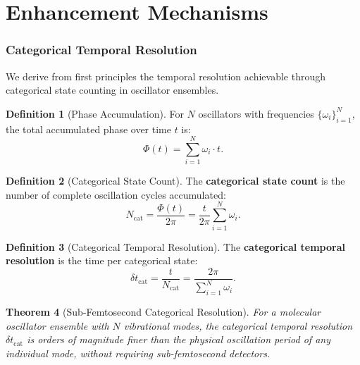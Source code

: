 \documentclass[11pt,twocolumn,a4paper]{article}
\newtheorem{theorem}{Theorem}[section]
\theoremstyle{definition}
\newtheorem{definition}[theorem]{Definition}
\theoremstyle{remark}
\begin{document}

\part{Enhancement Mechanisms}

\section{Categorical Temporal Resolution}
\label{sec:categorical_time}

We derive from first principles the temporal resolution achievable through categorical state counting in oscillator ensembles.

\begin{definition}[Phase Accumulation]
\label{def:phase}
For $N$ oscillators with frequencies $\{\omega_i\}_{i=1}^N$, the total accumulated phase over time $t$ is:
\begin{equation}
\Phi(t) = \sum_{i=1}^N \omega_i \cdot t.
\end{equation}
\end{definition}

\begin{definition}[Categorical State Count]
\label{def:ncat}
The \textbf{categorical state count} is the number of complete oscillation cycles accumulated:
\begin{equation}
N_{\mathrm{cat}} = \frac{\Phi(t)}{2\pi} = \frac{t}{2\pi} \sum_{i=1}^N \omega_i.
\end{equation}
\end{definition}

\begin{definition}[Categorical Temporal Resolution]
\label{def:dtcat}
The \textbf{categorical temporal resolution} is the time per categorical state:
\begin{equation}
\label{eq:dtcat}
\delta t_{\mathrm{cat}} = \frac{t}{N_{\mathrm{cat}}} = \frac{2\pi}{\sum_{i=1}^N \omega_i}.
\end{equation}
\end{definition}

\begin{theorem}[Sub-Femtosecond Categorical Resolution]
\label{thm:subfemto}
For a molecular oscillator ensemble with $N$ vibrational modes, the categorical temporal resolution $\delta t_{\mathrm{cat}}$ is orders of magnitude finer than the physical oscillation period of any individual mode, without requiring sub-femtosecond detectors.
\end{theorem}
\end{document}
